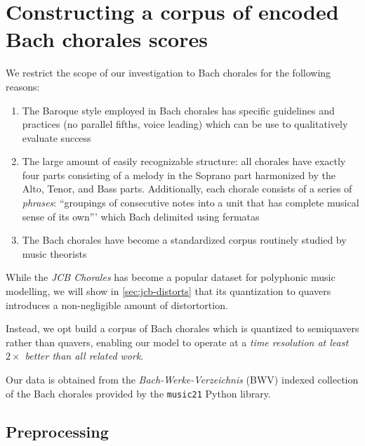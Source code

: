 \section{Constructing a corpus of encoded Bach chorales scores}


We restrict the scope of our investigation to Bach chorales for the following reasons:
\begin{enumerate}
  \item The Baroque style employed in Bach chorales has specific guidelines and
    practices \citep{piston1978harmony} (\eg no parallel fifths, voice leading)
    which can be use to qualitatively evaluate success
  \item The large amount of easily recognizable structure: all chorales have
    exactly four parts consisting of a melody in the Soprano part harmonized by
    the Alto, Tenor, and Bass parts. Additionally, each chorale consists of a
    series of \emph{phrases}: ``groupings of consecutive notes into a unit that
    has complete musical sense of its own'''\citep{nattiez1990music} which Bach
    delimited using fermatas
  \item The Bach chorales have become a standardized corpus routinely studied
    by music theorists\citep{white2002guidelines}
\end{enumerate}

While the \textit{JCB Chorales} \citep{Allan2005} has become a popular dataset
for polyphonic music modelling, we will show in \ref{sec:jcb-distorts} that its quantization to quavers
introduces a non-negligible amount of distortortion.

Instead, we opt build a corpus of Bach chorales which is quantized to
semiquavers rather than quavers, enabling our model to operate at a \emph{time
resolution at least $2\times$ better than all related work}.

Our data is obtained from the \emph{Bach-Werke-Verzeichnis} (BWV)
\citep{butt1999bach} indexed collection of the Bach chorales provided by the
\texttt{music21}\citep{Scott2015} Python library.

\subsection{Preprocessing}\label{sec:preprocessing}


